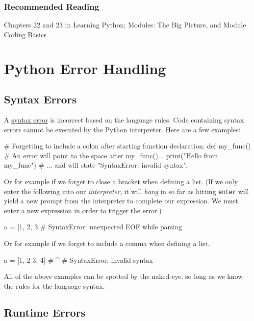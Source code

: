 \documentclass[12pt,letterpaper,twoside]{article}
\begin{document}
\subsubsection{Recommended Reading}
{ \small
  Chapters 22 and 23 in Learning Python; Modules: The Big Picture, and Module Coding Basics
}


\section{Python Error Handling}

\subsection{Syntax Errors}

A \href{https://en.wikipedia.org/wiki/Syntax_error}{syntax error} 
is incorrect based on the language rules.
Code containing syntax errors cannot be executed by the Python interpreter.
Here are a few examples:

\begin{python}
# Forgetting to include a colon after starting function declaration.
def my_func()                   # An error will point to the space after my_func()...
  print("Hello from my_func")   # ... and will state "SyntaxError: invalid syntax".
\end{python}

Or for example if we forget to close a bracket when defining a list.
(If we only enter the following into our \emph{interpreter}, it will \emph{hang} in so far as hitting \texttt{enter} will yield a new prompt from the interpreter to complete our expression. We must enter a new expression in order to trigger the error.)
\begin{python}
a = [1, 2, 3            # SyntaxError: unexpected EOF while parsing
\end{python}

Or for example if we forget to include a comma when defining a list.
\begin{python}
a = [1, 2 3, 4]
#        ^
# SyntaxError: invalid syntax
\end{python}

All of the above examples can be spotted by the naked-eye, so long as we know the rules for the language syntax.

\subsection{Runtime Errors}
\end{document}
